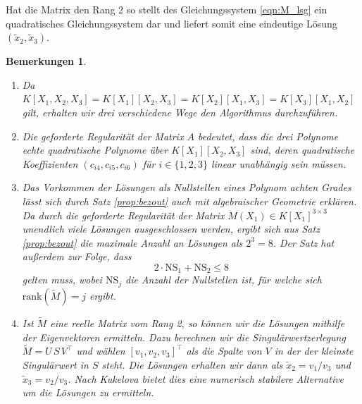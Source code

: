 \documentclass[a4paper,oneside, 11pt, openany%
]{article}
\theoremstyle{custom}
\theoremstyle{custom}
\newtheorem{remarks}[theorem]{Bemerkungen}
\begin{document}
	Hat die Matrix den Rang 2 so stellt des Gleichungssystem \eqref{eqn:M_lsg} ein quadratisches Gleichungssystem dar und liefert somit eine eindeutige Lösung $(\tilde{x}_{2},\tilde{x}_{3})$.
	\begin{remarks}
		~\begin{enumerate}
			\item Da $K[X_1,X_2,X_3] = K[X_1][X_2,X_3] = K[X_2][X_1,X_3] = K[X_3][X_1,X_2]$ gilt, erhalten wir drei verschiedene Wege den Algorithmus durchzuführen.
			\item Die geforderte Regularität der Matrix $A$ bedeutet, dass die drei Polynome echte quadratische Polynome über $K[X_1][X_2,X_3]$ sind, deren quadratische Koeffizienten $(c_{i4},c_{i5},c_{i6})$ für $i \in \{1,2,3\}$ linear unabhängig sein müssen.
			
			\item Das Vorkommen der Lösungen als Nullstellen eines Polynom achten Grades lässt sich durch Satz \ref{prop:bezout} auch mit algebraischer Geometrie erklären. Da durch die geforderte Regularität der Matrix $M(X_1) \in K[X_1]^{3 \times 3}$ unendlich viele Lösungen ausgeschlossen werden, ergibt sich aus Satz \ref{prop:bezout} die maximale Anzahl an Lösungen als $2^3=8$. Der Satz hat außerdem zur Folge, dass \[2 \cdot \text{NS}_{1} + \text{NS}_{2}  \leq 8\] gelten muss, wobei $\text{NS}_{j}$ die Anzahl der Nullstellen ist, für welche sich $\text{rank}\left(\tilde{M}\right) =j$ ergibt.
			\item Ist $\tilde{M}$ eine reelle Matrix vom Rang 2, so können wir die Lösungen mithilfe der Eigenvektoren ermitteln. Dazu berechnen wir die Singulärwertzerlegung $\tilde{M}=U \, S\, V^{\top}$ und wählen $\left[v_{1},v_{2},v_{3} \right]^{\top} $ als die Spalte von $V$ in der der kleinste Singulärwert in $S$ steht. Die Lösungen erhalten wir dann als $\tilde{x}_{2} = v_1/v_3$ und $\tilde{x}_{3} = v_2/v_3$.
			Nach Kukelova \cite{kukelova2016efficient} bietet dies eine numerisch stabilere Alternative um die Lösungen zu ermitteln.
		\end{enumerate}
	\end{remarks}
	\newpage
\end{document}

